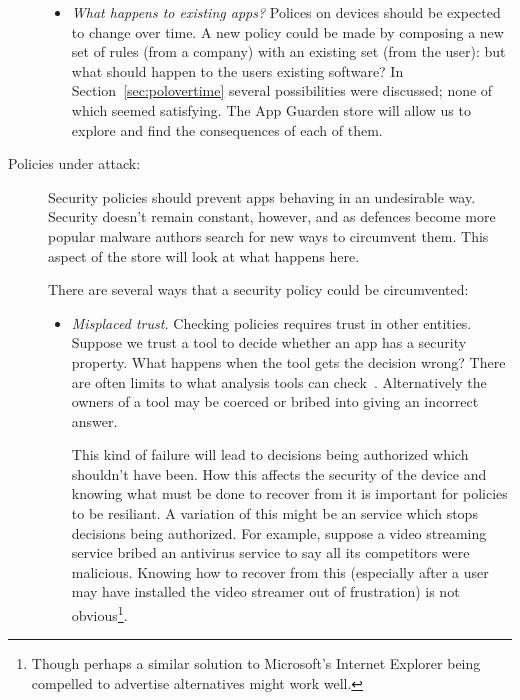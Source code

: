 \documentclass[a4paper]{article}
\begin{document}
\begin{description}
\begin{itemize}
      \item \emph{What happens to existing apps?} Polices on devices should be
        expected to change over time.  A new policy could be made by composing a
        new set of rules (from a company) with an existing set (from the user):
        but what should happen to the users existing software?  In
        Section~\ref{sec:polovertime} several possibilities were discussed; none
        of which seemed satisfying.  The App Guarden store will allow us to
        explore and find the consequences of each of them.
        
    \end{itemize}

  \item[Policies under attack:]  Security policies should prevent apps behaving
    in an undesirable way.  Security doesn't remain constant, however, and as
    defences become more popular malware authors search for new ways to
    circumvent them.  This aspect of the store will look at what happens here.

    There are several ways that a security policy could be circumvented:

    \begin{itemize} 
      
      \item \emph{Misplaced trust.}  Checking policies requires trust in other
        entities.  Suppose we trust a tool to decide whether an app has a
        security property.  What happens when the tool gets the decision wrong?
        There are often limits to what analysis tools can
        check~\cite{Livshits:ww}.  Alternatively the owners of a tool may be
        coerced or bribed into giving an incorrect answer.  
        
        This kind of failure will lead to decisions being authorized which
        shouldn't have been. How this affects the security of the device and
        knowing what must be done to recover from it is important for policies
        to be resiliant.  A variation of this might be an service which stops
        decisions being authorized.  For example, suppose a video streaming
        service bribed an antivirus service to say all its competitors were
        malicious.  Knowing how to recover from this (especially after a user
        may have installed the video streamer out of frustration) is not
        obvious\footnote{Though perhaps a similar solution to Microsoft's
        Internet Explorer being compelled to advertise alternatives might work
          well.}.


\end{itemize}
\end{description}
\end{document}
